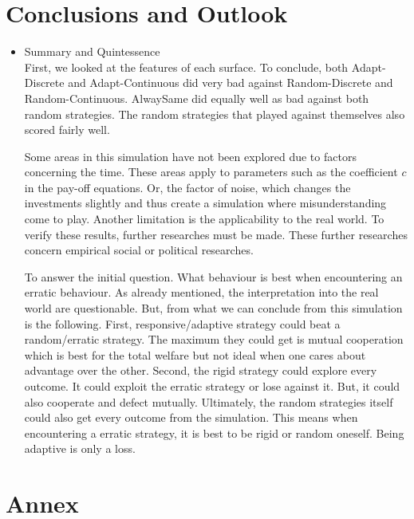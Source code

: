 \documentclass{article}
\begin{document}
\section{Conclusions and Outlook}
\begin{itemize}

	\item Summary and Quintessence\\
		First, we looked at the features of each surface.
		To conclude, both Adapt-Discrete and Adapt-Continuous did very bad against Random-Discrete and Random-Continuous.
		AlwaySame did equally well as bad against both random strategies.
		The random strategies that played against themselves also scored fairly well.

		Some areas in this simulation have not been explored due to factors concerning the time.
		These areas apply to parameters such as the coefficient $c$ in the pay-off equations.
		Or, the factor of noise, which changes the investments slightly and thus create a simulation where misunderstanding come to play.
		Another limitation is the applicability to the real world.
		To verify these results, further researches must be made.
		These further researches concern empirical social or political researches.

		To answer the initial question.
		What behaviour is best when encountering an erratic behaviour.
		As already mentioned, the interpretation into the real world are questionable.
		But, from what we can conclude from this simulation is the following.
		First, responsive/adaptive strategy could beat a random/erratic strategy.
		The maximum they could get is mutual cooperation which is best for the total welfare but not ideal when one cares about advantage over the other.
		Second, the rigid strategy could explore every outcome.
		It could exploit the erratic strategy or lose against it.
		But, it could also cooperate and defect mutually.
		Ultimately, the random strategies itself could also get every outcome from the simulation.
		This means when encountering a erratic strategy, it is best to be rigid or random oneself.
		Being adaptive is only a loss.

\end{itemize}

%
%
%

\section{Annex}
\end{document}
